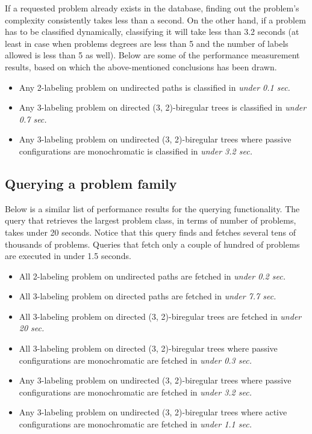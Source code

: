 If a requested problem already exists in the database, finding out
the problem's complexity consistently takes less than a second.
On the other hand, if a problem has to be classified dynamically,
classifying it will take less than 3.2 seconds (at least in case when
problems degrees are less than 5 and the number of labels allowed is less
than 5 as well). Below are some of the performance measurement results,
based on which the above-mentioned conclusions has been drawn.

\begin{itemize}
  \item Any 2-labeling problem on undirected paths is classified in \emph{under 0.1 sec.}
  \item Any 3-labeling problem on directed (3, 2)-biregular trees is classified in \emph{under 0.7 sec.}
  \item Any 3-labeling problem on undirected (3, 2)-biregular trees where passive configurations are monochromatic is classified in \emph{under 3.2 sec.}
\end{itemize}

\subsection{Querying a problem family}

Below is a similar list of performance results for the querying
functionality. The query that retrieves the largest problem class, in terms of
number of problems, takes under 20 seconds. Notice that this query
finds and fetches several tens of thousands of problems. Queries
that fetch only a couple of hundred of problems are executed in under 1.5 seconds.

\begin{itemize}
  \item All 2-labeling problem on undirected paths are fetched in \emph{under 0.2 sec.}
  \item All 3-labeling problem on directed paths are fetched in \emph{under 7.7 sec.}
  \item All 3-labeling problem on directed (3, 2)-biregular trees are fetched in \emph{under 20 sec.}
  \item All 3-labeling problem on directed (3, 2)-biregular trees where passive configurations are monochromatic are fetched in \emph{under 0.3 sec.}
  \item Any 3-labeling problem on undirected (3, 2)-biregular trees where passive configurations are monochromatic are fetched in \emph{under 3.2 sec.}
  \item Any 3-labeling problem on undirected (3, 2)-biregular trees where active configurations are monochromatic are fetched in \emph{under 1.1 sec.}
\end{itemize}

